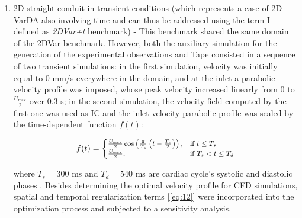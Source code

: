 \begin{enumerate}
    \item 2D straight conduit in transient conditions (which represents a case of 2D VarDA also involving time and can thus be addressed using the term I defined as \emph{2DVar+t} benchmark) - This benchmark shared the same domain of the 2DVar benchmark. However, both the auxiliary simulation for the generation of the experimental observations and Tape consisted in a sequence of two transient simulations: in the first simulation, velocity was initially equal to 0 mm/s everywhere in the domain, and at the inlet a parabolic velocity profile was imposed, whose peak velocity increased linearly from 0 to \( \frac{ U_{\text{max}}}{2} \) over 0.3 s; in the second simulation, the velocity field computed by the first one was used as IC and the inlet velocity parabolic profile was scaled by the time-dependent function \( f(t) \):

\begin{equation}
\small
f(t) = 
\begin{cases}
\frac{U_{\text{max}}}{2}\cos\left(\frac{\pi}{T_s}\left(t - \frac{T_s}{2}\right)\right), & \text{if } t \leq T_s \\
\frac{U_{\text{max}}}{2}, & \text{if } T_s < t \leq T_d
\label{eq:13}
\end{cases}
\end{equation}

where \( T_s = 300 \) ms and \( T_d = 540 \) ms are cardiac cycle's systolic and diastolic phases \citep{Katz1977}. Besides determining the optimal velocity profile for CFD simulations, spatial and temporal regularization terms [\cref{eq:12}] were incorporated into the optimization process and subjected to a sensitivity analysis.\\


\end{enumerate}
